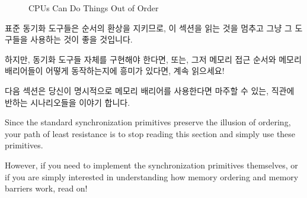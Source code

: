 \begin{figure}[htb]
\begin{center}
\end{center}
\caption{CPUs Can Do Things Out of Order}
\end{figure}

표준 동기화 도구들은 순서의 환상을 지키므로, 이 섹션을 읽는 것을 멈추고 그냥 그
도구들을 사용하는 것이 좋을 것입니다.

하지만, 동기화 도구들 자체를 구현해야 한다면, 또는, 그저 메모리 접근 순서와
메모리 배리어들이 어떻게 동작하는지에 흥미가 있다면, 계속 읽으세요!

다음 섹션은 당신이 명시적으로 메모리 배리어를 사용한다면 마주할 수 있는, 직관에
반하는 시나리오들을 이야기 합니다.
\iffalse

Since the standard synchronization primitives preserve the illusion of
ordering, your path of least resistance is to stop reading
this section and simply use these primitives.

However, if you need to implement the synchronization primitives
themselves, or if you are simply interested in understanding how memory
ordering and memory barriers work, read on!

